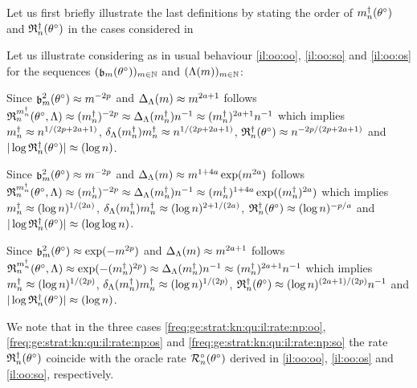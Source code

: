 \begin{te}
 Let us first briefly illustrate the last definitions by stating the
 order of $\aDi{\ssY}(\xdf)$ and $\naRa{(\xdf)}$ in the cases considered
 in 
\end{te}
\begin{il}\label{freq:ge:strat:kn:qu:il:rate}Let us illustrate  
  considering as in  usual behaviour \ref{il:oo:oo},
  \ref{il:oo:so} and \ref{il:oo:os} for the sequences
  $\Nsuite[\Di]{\bias[\Di](\xdf)}$ and $\Nsuite[\Di]{\iSv[\Di]}$:
  \begin{Liste}[]
  \item[\mylabel{freq:ge:strat:kn:qu:il:rate:np:oo}{\dg\bfseries{[o-o]}}] Since
    $\bias^2(\xdf)\approx\Di^{-2p}$ and $\DipenSv\approx\Di^{2a+1}$ follows
    $\daRa{\aDi{\ssY}}{(\xdf,\Lambda)}\approx(\aDi{\ssY})^{-2p}\approx\DipenSv[\aDi{\ssY}]\ssY^{-1}\approx(\aDi{\ssY})^{2a+1}\ssY^{-1}$
    which implies $\aDi{\ssY}\approx\ssY^{1/(2p+2a+1)}$,
    $\cmiSv[\aDi{\ssY}]\aDi{\ssY}\approx\ssY^{1/(2p+2a+1)}$,
    $\naRa{(\xdf)}\approx\ssY^{-2p/(2p+2a+1)}$ and
    $ \vert \log\naRa{(\xdf)} \vert \approx(\log\ssY)$.
  \item[\mylabel{freq:ge:strat:kn:qu:il:rate:np:os}{\dg\bfseries{[o-s]}}] Since
    $\bias^2(\xdf)\approx\Di^{-2p}$ and
    $\DipenSv\approx\Di^{1+4a}\exp(\Di^{2a})$ follows
    $\daRa{\aDi{\ssY}}{(\xdf,\Lambda)}\approx(\aDi{\ssY})^{-2p}\approx\DipenSv[\aDi{\ssY}]\ssY^{-1}\approx(\aDi{\ssY})^{1+4a}\exp((\aDi{\ssY})^{2a})$
    which implies $\aDi{\ssY}\approx(\log\ssY)^{1/(2a)}$,
    $\cmiSv[\aDi{\ssY}]\aDi{\ssY}\approx(\log\ssY)^{2+1/(2a)}$,
    $\naRa{(\xdf)}\approx(\log\ssY)^{-p/a}$ and
    $ \vert \log\naRa{(\xdf)} \vert \approx(\log\log\ssY)$.
  \item[\mylabel{freq:ge:strat:kn:qu:il:rate:np:so}{\dg\bfseries{[s-o]}}] Since
    $\bias^2(\xdf)\approx\exp(-\Di^{2p})$ and $\DipenSv\approx\Di^{2a+1}$
    follows
    $\daRa{\aDi{\ssY}}{(\xdf,\Lambda)}\approx\exp(-(\aDi{\ssY})^{2p})\approx\DipenSv[\aDi{\ssY}]\ssY^{-1}\approx
    (\aDi{\ssY})^{2a+1}\ssY^{-1}$ which implies
    $\aDi{\ssY}\approx(\log\ssY)^{1/(2p)}$,
    $\cmiSv[\aDi{\ssY}]\aDi{\ssY}\approx(\log\ssY)^{1/(2p)}$,
    $\naRa{(\xdf)}\approx(\log\ssY)^{(2a+1)/(2p)}\ssY^{-1}$ and
    $ \vert \log\naRa{(\xdf)} \vert \approx(\log\ssY)$.
  \end{Liste}
  We note that  in the three cases \ref{freq:ge:strat:kn:qu:il:rate:np:oo},
  \ref{freq:ge:strat:kn:qu:il:rate:np:os} and \ref{freq:ge:strat:kn:qu:il:rate:np:so} the rate
  $\naRa{(\xdf)}$ coincide with the
  oracle rate $\oRa{\xdf}$ derived in  \ref{il:oo:oo},
  \ref{il:oo:os} and \ref{il:oo:so}, respectively.\ilEnd 
\end{il}
